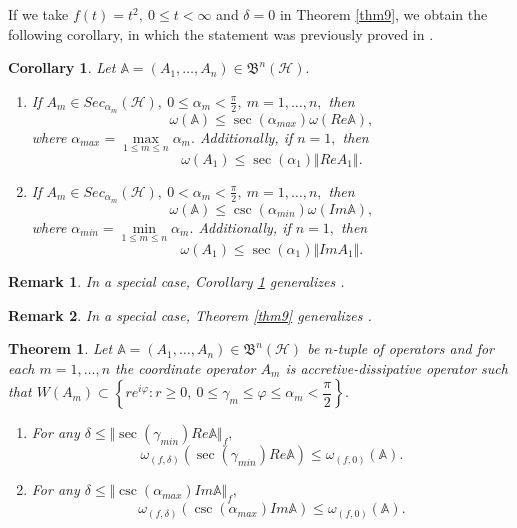 \documentclass[12pt]{article}
\newtheorem{theorem}{Theorem}
\newtheorem{corollary}{Corollary}
\newtheorem{remark}{Remark}
\begin{document}
If we take $ f(t)=t^{2}, \ 0\leq t < \infty  $  and $ \delta=0 $ in Theorem \ref{thm9}, we obtain the following corollary, in which the statement \label{item1-cor7} was previously proved in \cite{Bedrani2020}.
\begin{corollary}
\label{cor11}
Let  $ \mathbb{A}=(A_{1},\ldots , A_{n})\in\mathfrak{B}^{n}(\mathcal{H}). $
\begin{enumerate}[label=\upshape{\arabic*.}, ref=\upshape{\arabic*}, labelindent=5pt, leftmargin=*,ref=\upshape{\arabic*}]
\item \label{item1-cor11} If $ A_{m}\in Sec_{\alpha_{m}}(\mathcal{H}), \ 0\leq \alpha_{m}< \frac{\pi}{2}, \ m=1, \ldots ,n,  $ then
\[
\omega (\mathbb{A})\leq \sec(\alpha_{max})\omega (Re \mathbb{A}),
\]
where $ \alpha_{max}=\max\limits_{1\leq m \leq n}\alpha_{m}. $
Additionally, if $ n=1, $ then
\[
\omega (A_{1})\leq \sec(\alpha_{1})\Vert ReA_{1} \Vert .
\]
\item \label{item2-cor11} If $ A_{m}\in Sec_{\alpha_{m}}(\mathcal{H}), \ 0 < \alpha_{m}< \frac{\pi}{2}, \ m=1, \ldots ,n, $ then
\[
\omega (\mathbb{A})\leq \csc(\alpha_{min})\omega (Im \mathbb{A}),
\]
where $ \alpha_{min}=\min\limits_{1\leq m \leq n}\alpha_{m}. $
Additionally, if $ n=1, $ then
\[
\omega (A_{1})\leq \sec(\alpha_{1})\Vert ImA_{1} \Vert .
\]
\end{enumerate}
\end{corollary}
\begin{remark}
In a special case, Corollary \ref{cor11} generalizes \textnormal{\cite[Corollary 3.3]{Ismailov2026}}.
\end{remark}
\begin{remark}
In a special case, Theorem \ref{thm9} generalizes \textnormal{\cite[Thm. 3.1]{Ismailov2026}}.
\end{remark}
\begin{theorem}
\label{thm10}
Let $ \mathbb{A}=(A_{1},\ldots , A_{n})\in\mathfrak{B}^{n}(\mathcal{H}) $ be $n$-tuple of operators and for each $ m=1,\ldots ,n $ the coordinate operator $ A_{m} $ is accretive-dissipative operator such that
\(
W(A_{m})\subset \left\lbrace  re^{i\varphi}: r\geq 0, \ 0\leq \gamma_{m}\leq \varphi \leq \alpha_{m}<\dfrac{\pi}{2}\right\rbrace .
\)
\begin{enumerate}[label=\upshape{\arabic*.}, ref=\upshape{\arabic*}, labelindent=5pt, leftmargin=*,ref=\upshape{\arabic*.}]
\item \label{item1-thm10} For any $ \delta\leq \Vert \sec(\gamma_{min})Re \mathbb{A} \Vert_{f}, $
\[
\omega_{(f,\delta)}(\sec(\gamma_{min})Re \mathbb{A})\leq \omega_{(f,0)}(\mathbb{A}).
\]
\item  \label{item2-thm10} For any $ \delta\leq \Vert \csc(\alpha_{max})Im \mathbb{A} \Vert_{f}, $
\[
\omega_{(f,\delta)}(\csc(\alpha_{max})Im \mathbb{A})\leq \omega_{(f,0)}(\mathbb{A}).
\]
\end{enumerate}
\end{theorem}
\end{document}
